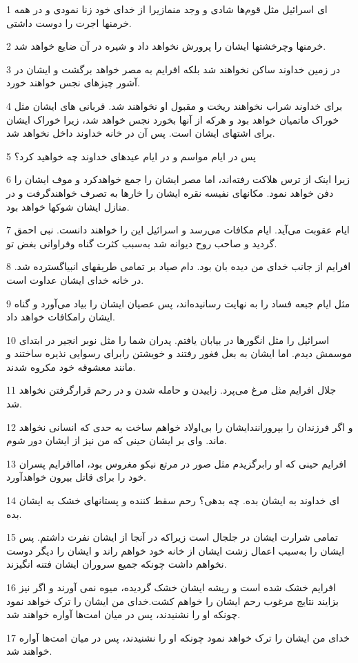 \par 1 ای اسرائیل مثل قوم‌ها شادی و وجد منمازیرا از خدای خود زنا نمودی و در همه خرمنها اجرت را دوست داشتی.
\par 2 خرمنها وچرخشتها ایشان را پرورش نخواهد داد و شیره در آن ضایع خواهد شد.
\par 3 در زمین خداوند ساکن نخواهند شد بلکه افرایم به مصر خواهد برگشت و ایشان در آشور چیزهای نجس خواهند خورد.
\par 4 برای خداوند شراب نخواهند ریخت و مقبول او نخواهند شد. قربانی های ایشان مثل خوراک ماتمیان خواهد بود و هرکه از آنها بخورد نجس خواهد شد، زیرا خوراک ایشان برای اشتهای ایشان است. پس آن در خانه خداوند داخل نخواهد شد.
\par 5 پس در ایام مواسم و در ایام عیدهای خداوند چه خواهید کرد؟
\par 6 زیرا اینک از ترس هلاکت رفته‌اند، اما مصر ایشان را جمع خواهدکرد و موف ایشان را دفن خواهد نمود. مکانهای نفیسه نقره ایشان را خارها به تصرف خواهندگرفت و در منازل ایشان شوکها خواهد بود.
\par 7 ایام عقوبت می‌آید. ایام مکافات می‌رسد و اسرائیل این را خواهند دانست. نبی احمق گردید و صاحب روح دیوانه شد به‌سبب کثرت گناه وفراوانی بغض تو.
\par 8 افرایم از جانب خدای من دیده بان بود. دام صیاد بر تمامی طریقهای انبیاگسترده شد. در خانه خدای ایشان عداوت است.
\par 9 مثل ایام جبعه فساد را به نهایت رسانیده‌اند، پس عصیان ایشان را بیاد می‌آورد و گناه ایشان رامکافات خواهد داد.
\par 10 اسرائیل را مثل انگورها در بیابان یافتم. پدران شما را مثل نوبر انجیر در ابتدای موسمش دیدم. اما ایشان به بعل فغور رفتند و خویشتن رابرای رسوایی نذیره ساختند و مانند معشوقه خود مکروه شدند.
\par 11 جلال افرایم مثل مرغ می‌پرد. زاییدن و حامله شدن و در رحم قرارگرفتن نخواهد شد.
\par 12 و اگر فرزندان را بپرورانندایشان را بی‌اولاد خواهم ساخت به حدی که انسانی نخواهد ماند. وای بر ایشان حینی که من نیز از ایشان دور شوم.
\par 13 افرایم حینی که او رابرگزیدم مثل صور در مرتع نیکو مغروس بود، اماافرایم پسران خود را برای قاتل بیرون خواهدآورد.
\par 14 ‌ای خداوند به ایشان بده. چه بدهی؟ رحم سقط کننده و پستانهای خشک به ایشان بده.
\par 15 تمامی شرارت ایشان در جلجال است زیراکه در آنجا از ایشان نفرت داشتم. پس ایشان را به‌سبب اعمال زشت ایشان از خانه خود خواهم راند و ایشان را دیگر دوست نخواهم داشت چونکه جمیع سروران ایشان فتنه انگیزند.
\par 16 افرایم خشک شده است و ریشه ایشان خشک گردیده، میوه نمی آورند و اگر نیز بزایند نتایج مرغوب رحم ایشان را خواهم کشت.خدای من ایشان را ترک خواهد نمود چونکه او را نشنیدند، پس در میان امت‌ها آواره خواهند شد.
\par 17 خدای من ایشان را ترک خواهد نمود چونکه او را نشنیدند، پس در میان امت‌ها آواره خواهند شد.

